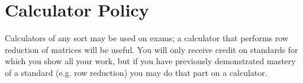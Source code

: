 \documentclass[letterpaper]{article}
\begin{document}
\section*{\fontsize{12}{15}\selectfont Calculator Policy}

Calculators of any sort may be used on exams; a calculator that performs row reduction of matrices will be useful.  You will only receive credit on standards for which you show all your work, but if you have previously demonstrated mastery of a standard (e.g. row reduction) you may do that part on a calculator.  
\end{document}
